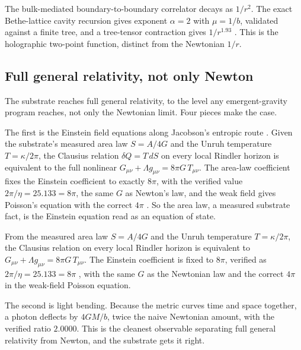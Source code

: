 \begin{result}
The bulk-mediated boundary-to-boundary correlator decays as $1/r^2$. The exact Bethe-lattice cavity recursion
gives exponent $\alpha = 2$ with $\mu = 1/b$, validated against a finite tree, and a tree-tensor contraction
gives $1/r^{1.93}$ \cite{pollard2026vibetest}. This is the holographic two-point function, distinct from the
Newtonian $1/r$.
\end{result}

\subsection{Full general relativity, not only Newton}

The substrate reaches full general relativity, to the level any emergent-gravity program reaches, not only the
Newtonian limit. Four pieces make the case.

The first is the Einstein field equations along Jacobson's entropic route \cite{jacobson1995}. Given the
substrate's measured area law $S = A/4G$ and the Unruh temperature $T = \kappa/2\pi$, the Clausius relation
$\delta Q = T\, dS$ on every local Rindler horizon is equivalent to the full nonlinear
$G_{\mu\nu} + \Lambda g_{\mu\nu} = 8\pi G\, T_{\mu\nu}$. The area-law coefficient fixes the Einstein coefficient
to exactly $8\pi$, with the verified value $2\pi/\eta = 25.133 = 8\pi$, the same $G$ as Newton's law, and the
weak field gives Poisson's equation with the correct $4\pi$ \cite{padmanabhan2010, verlinde2011}. So the area
law, a measured substrate fact, is the Einstein equation read as an equation of state.

\begin{result}
From the measured area law $S = A/4G$ and the Unruh temperature $T = \kappa/2\pi$, the Clausius relation on every
local Rindler horizon is equivalent to $G_{\mu\nu} + \Lambda g_{\mu\nu} = 8\pi G\, T_{\mu\nu}$. The Einstein
coefficient is fixed to $8\pi$, verified as $2\pi/\eta = 25.133 = 8\pi$ \cite{pollard2026vibetest}, with the same
$G$ as the Newtonian law and the correct $4\pi$ in the weak-field Poisson equation.
\end{result}

The second is light bending. Because the metric curves time and space together, a photon deflects by
$4GM/b$, twice the naive Newtonian amount, with the verified ratio $2.0000$. This is the cleanest observable
separating full general relativity from Newton, and the substrate gets it right.

